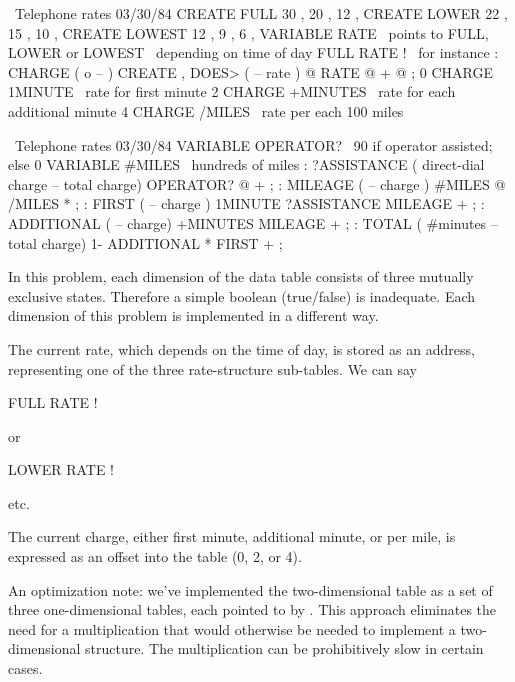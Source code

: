 \begin{figure*}[bbbt]
\begin{Screen}
\ Telephone rates                                       03/30/84
CREATE FULL     30 , 20 , 12 ,
CREATE LOWER    22 , 15 , 10 ,
CREATE LOWEST   12 ,  9 ,  6 ,
VARIABLE RATE   \ points to FULL, LOWER or LOWEST
                \ depending on time of day
FULL RATE !  \ for instance
: CHARGE   ( o -- ) CREATE ,
   DOES>  ( -- rate )  @  RATE @ +  @ ;
0 CHARGE 1MINUTE   \ rate for first minute
2 CHARGE +MINUTES  \ rate for each additional minute
4 CHARGE /MILES    \ rate per each 100 miles
\end{Screen}

\begin{Screen}
\ Telephone rates                                       03/30/84
VARIABLE OPERATOR?  \ 90 if operator assisted; else 0
VARIABLE #MILES  \ hundreds of miles
: ?ASSISTANCE  ( direct-dial charge -- total charge)
   OPERATOR? @  + ;
: MILEAGE  ( -- charge )  #MILES @  /MILES * ;
: FIRST  ( -- charge )  1MINUTE  ?ASSISTANCE  MILEAGE + ;
: ADDITIONAL  ( -- charge)  +MINUTES  MILEAGE + ;
: TOTAL ( #minutes -- total charge)
   1- ADDITIONAL *  FIRST + ;
\end{Screen}
\end{figure*}

In this problem, each dimension of the data table consists of three
mutually exclusive states. Therefore a simple boolean (true/false) is
inadequate. Each dimension of this problem is implemented in a different
way.

The current rate, which depends on the time of day, is stored as an
address, representing one of the three rate-structure sub-tables. We can
say
\begin{Code}
FULL RATE !
\end{Code}
or
\begin{Code}
LOWER RATE !
\end{Code}
etc.\goodbreak

The current charge, either first minute, additional minute, or per mile,
is expressed as an offset into the table (0, 2, or 4).

An optimization note: we've implemented the two-dimensional table as a set
of three one-dimensional tables, each pointed to by . This
approach eliminates the need for a multiplication that would otherwise be
needed to implement a two-dimensional structure. The multiplication can be
prohibitively slow in certain cases.%
%

